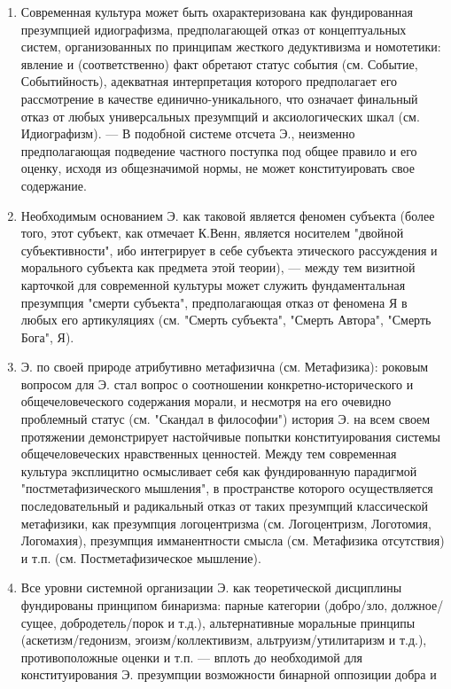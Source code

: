\documentclass[12pt]{article}
\begin{document}
\begin{enumerate}
\item Современная культура может
быть  охарактеризована  как  фундированная  презумпцией  идиографизма,  предполагающей  отказ  от
концептуальных  систем,  организованных  по  принципам  жесткого  дедуктивизма  и  номотетики:  явление  и
(соответственно)  факт  обретают  статус  события  (см.  Событие,  Событийность),  адекватная  интерпретация
которого предполагает его рассмотрение в качестве единично-уникального, что означает финальный отказ от
любых универсальных презумпций и аксиологических шкал (см. Идиографизм). — В подобной системе отсчета
Э., неизменно предполагающая подведение частного поступка под общее правило и его оценку, исходя из
общезначимой нормы, не может конституировать
 свое содержание.
\item Необходимым основанием Э. как таковой является феномен субъекта (более того, этот
субъект, как отмечает К.Венн, является носителем "двойной субъективности", ибо интегрирует в себе субъекта
этического рассуждения и морального субъекта как предмета этой теории), — между тем визитной карточкой
для современной культуры может служить фундаментальная презумпция "смерти субъекта", предполагающая
отказ от феномена Я в любых его артикуляциях (см. "Смерть субъекта", "Смерть Автора", "Смерть Бога", Я).
\item
Э. по своей природе атрибутивно метафизична (см. Метафизика): роковым вопросом для Э. стал вопрос о
соотношении конкретно-исторического и общечеловеческого содержания морали, и несмотря на его очевидно
проблемный  статус  (см.  "Скандал  в  философии")  история  Э.  на  всем  своем  протяжении  демонстрирует
настойчивые  попытки  конституирования  системы  общечеловеческих  нравственных  ценностей.  Между  тем
современная культура эксплицитно осмысливает себя как фундированную парадигмой "постметафизического
мышления",  в  пространстве  которого  осуществляется  последовательный  и  радикальный  отказ  от  таких
презумпций  классической  метафизики,  как  презумпция  логоцентризма  (см.  Логоцентризм,  Логотомия,
Логомахия), презумпция имманентности смысла (см. Метафизика отсутствия) и т.п. (см. Постметафизическое
мышление).
\item Все уровни системной организации Э. как теоретической дисциплины фундированы принципом
бинаризма: парные категории (добро/зло, должное/сущее, добродетель/порок и т.д.), альтернативные моральные
принципы (аскетизм/гедонизм, эгоизм/коллективизм, альтруизм/утилитаризм и т.д.), противоположные оценки и
т.п. — вплоть до необходимой для конституирования Э. презумпции возможности бинарной оппозиции добра и

\end{enumerate}
\end{document}
